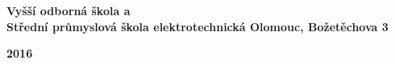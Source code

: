 \begin{titlepage}
	\centering

	\begin{figure}[H]
		\centering
		\vspace{-20pt}
		
	\end{figure}
	{\LARGE \bfseries Vyšší odborná škola a \\Střední průmyslová škola elektrotechnická Olomouc, Božetěchova 3}

	\vspace*{\fill}


	\vfill

	{\LARGE \bfseries 2016 \hfill \theauthor}
\end{titlepage}